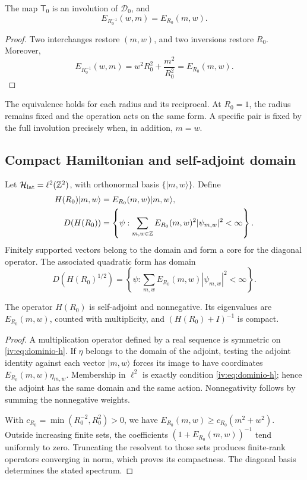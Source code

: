 \begin{theorem}
\label{iv:thm:dualidad-escalar}
The map \(\mathsf T_0\) is an involution of
\(\mathscr D_0\), and
\[
 E_{R_0^{-1}}(w,m)=E_{R_0}(m,w).
\]
\end{theorem}
\begin{proof}
Two interchanges restore \((m,w)\), and two inversions restore
\(R_0\). Moreover,
\[
 E_{R_0^{-1}}(w,m)=w^2R_0^2+\frac{m^2}{R_0^2}
 =E_{R_0}(m,w).
\]
\end{proof}

The equivalence holds for each radius and its reciprocal. At \(R_0=1\),
the radius remains fixed and the operation acts on the same form.
A specific pair is fixed by the full involution precisely
when, in addition, \(m=w\).

\subsection{Compact Hamiltonian and self-adjoint domain}

Let \(\mathcal H_{\mathrm{lat}}=\ell^2(\mathbb Z^2)\), with
orthonormal basis \(\{|m,w\rangle\}\). Define
\begin{align}
 H(R_0)|m,w\rangle&=E_{R_0}(m,w)|m,w\rangle,\label{iv:eq:hamiltoniano}\\
 D(H(R_0))&=\left\{\psi:\sum_{m,w\in\mathbb Z}
 E_{R_0}(m,w)^2|\psi_{m,w}|^2<\infty\right\}.\label{iv:eq:dominio-h}
\end{align}
Finitely supported vectors belong to the domain and form a
core for the diagonal operator. The associated quadratic form has
domain
\[
 D(H(R_0)^{1/2})=\left\{\psi:\sum_{m,w}
 E_{R_0}(m,w)|\psi_{m,w}|^2<\infty\right\}.
\]

\begin{proposition}
\label{iv:prop:h-autoadjunto}
The operator \(H(R_0)\) is self-adjoint and nonnegative. Its
eigenvalues are \(E_{R_0}(m,w)\), counted with multiplicity,
and \((H(R_0)+I)^{-1}\) is compact.
\end{proposition}
\begin{proof}
A multiplication operator defined by a real sequence is symmetric
on \eqref{iv:eq:dominio-h}. If \(\eta\) belongs to the domain
of the adjoint, testing the adjoint identity against each vector
\(|m,w\rangle\) forces its image to have coordinates
\(E_{R_0}(m,w)\eta_{m,w}\). Membership in
\(\ell^2\) is exactly condition \eqref{iv:eq:dominio-h}; hence
the adjoint has the same domain and the same action. Nonnegativity
follows by summing the nonnegative weights.

With \(c_{R_0}=\min(R_0^{-2},R_0^2)>0\), we have
\(E_{R_0}(m,w)\geq c_{R_0}(m^2+w^2)\). Outside increasing
finite sets, the coefficients
\((1+E_{R_0}(m,w))^{-1}\) tend uniformly to zero.
Truncating the resolvent to those sets produces finite-rank
operators converging in norm, which proves its
compactness. The diagonal basis determines the stated spectrum.
\end{proof}

